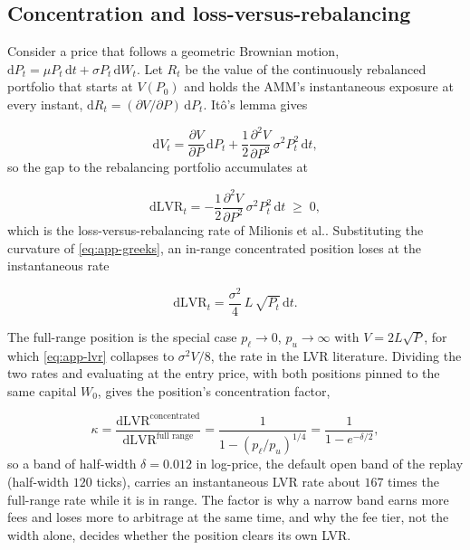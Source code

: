 \subsection{Concentration and loss-versus-rebalancing}

Consider a price that follows a geometric Brownian motion,
$\mathrm{d}P_t=\mu P_t\,\mathrm{d}t+\sigma P_t\,\mathrm{d}W_t$. Let
$R_t$ be the value of the continuously rebalanced portfolio that starts at
$V(P_0)$ and holds the AMM's instantaneous exposure at every instant,
$\mathrm{d}R_t=({\partial V}/{\partial P})\,\mathrm{d}P_t$. It\^o's lemma
gives

\begin{equation}
\mathrm{d}V_t = \frac{\partial V}{\partial P}\,\mathrm{d}P_t
+ \frac{1}{2}\frac{\partial^2 V}{\partial P^2}\,\sigma^2P_t^2\,\mathrm{d}t,
\label{eq:app-ito}
\end{equation}
so the gap to the rebalancing portfolio accumulates at

\begin{equation}
\mathrm{dLVR}_t = -\frac{1}{2}\frac{\partial^2 V}{\partial P^2}\,\sigma^2P_t^2\,\mathrm{d}t
\;\ge\;0 ,
\label{eq:app-lvr-general}
\end{equation}
which is the loss-versus-rebalancing rate of Milionis et al.\cite{milionis2022lvr}.
Substituting the curvature of \eqref{eq:app-greeks}, an in-range concentrated
position loses at the instantaneous rate

\begin{equation}
\mathrm{dLVR}_t = \frac{\sigma^2}{4}\,L\,\sqrt{P_t}\,\mathrm{d}t .
\label{eq:app-lvr}
\end{equation}

The full-range position is the special case $p_\ell\to0$, $p_u\to\infty$ with
$V=2L\sqrt{P}$, for which \eqref{eq:app-lvr} collapses to
$\sigma^2V/8$, the rate in the LVR literature. Dividing the two rates and
evaluating at the entry price, with both positions pinned to the same capital
$W_0$, gives the position's concentration factor,

\begin{equation}
\kappa = \frac{\mathrm{dLVR}^{\text{concentrated}}}
{\mathrm{dLVR}^{\text{full range}}}
= \frac{1}{1-(p_\ell/p_u)^{1/4}}
= \frac{1}{1-e^{-\delta/2}} ,
\label{eq:app-kappa}
\end{equation}
so a band of half-width $\delta=0.012$ in log-price, the default open band of
the replay (half-width $120$ ticks), carries an instantaneous LVR rate about
$167$ times the full-range
rate while it is in range. The factor is why a narrow band earns more fees and
loses more to arbitrage at the same time, and why the fee tier, not the width
alone, decides whether the position clears its own LVR.

